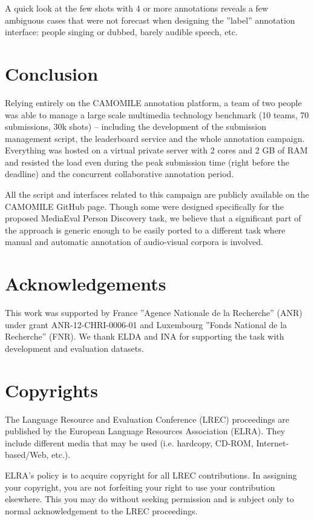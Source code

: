 \documentclass[10pt, a4paper]{article}
\begin{document}
A quick look at the few shots with 4 or more annotations reveals a few
ambiguous cases that were not forecast when designing the ''label'' annotation
interface: people singing or dubbed, barely audible speech, etc.


\section{Conclusion}

Relying entirely on the CAMOMILE annotation platform, a team of two people was
able to manage a large scale multimedia technology benchmark (10 teams,
70 submissions, 30k shots) -- including the development of the submission
management script, the leaderboard service and the whole annotation campaign.
Everything was hosted on a virtual private server with 2 cores and 2 GB of RAM
and resisted the load even during the peak submission time (right before the
deadline) and the concurrent collaborative annotation period.

All the script and interfaces related to this campaign are publicly available
on the CAMOMILE GitHub page. Though some were designed specifically for the
proposed MediaEval Person Discovery task, we believe that a significant part of
the approach is generic enough to be easily ported to a different task
where manual and automatic annotation of audio-visual corpora is involved.


\section{Acknowledgements}

This work was supported by France ''Agence Nationale de la Recherche''
(ANR) under grant ANR-12-CHRI-0006-01 and Luxembourg ''Fonds National de la
Recherche'' (FNR). We thank ELDA and INA for supporting the task with
development and evaluation datasets.

\section{Copyrights}

The Lan\-gua\-ge Re\-sour\-ce and Evalua\-tion Con\-fe\-rence (LREC) proceedings are published by the European Language Resources Association (ELRA). They include different media that may be used (i.e. hardcopy, CD-ROM, Internet-based/Web, etc.).

ELRA's policy is to acquire copyright for all LREC contributions. In assigning your copyright, you are not forfeiting your right to use your contribution elsewhere.  This you may do without seeking permission and is subject only to normal acknowledgement to the LREC proceedings.




\end{document}
